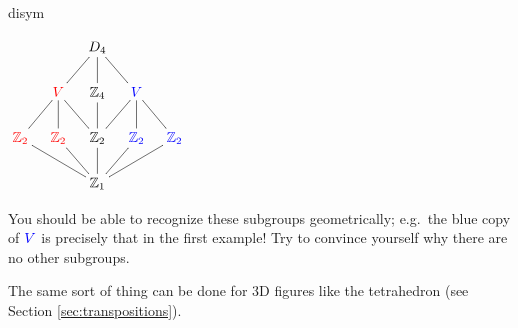 \begin{examples}{}{disym}
\begin{enumerate}
\begin{minipage}[t]{\linewidth}
\begin{minipage}[t]{.31\linewidth}
			$\xymatrix @R18pt @C10pt{%
				&& D_4 \ar@{-}[dl] \ar@{-}[d] \ar@{-}[dr] &&\\
				& \textcolor{red}{V} \ar@{-}[dr] \ar@{-}[d] \ar@{-}[dl] & \Z_4 \ar@{-}[d] & \textcolor{blue}{V} \ar@{-}[dr] \ar@{-}[d] \ar@{-}[dl] & \\
				\textcolor{red}{\Z_2} \ar@{-}[drr] & \textcolor{red}{\Z_2} \ar@{-}[dr] & \Z_2 \ar@{-}[d] & \textcolor{blue}{\Z_2} \ar@{-}[dl] & \textcolor{blue}{\Z_2} \ar@{-}[dll] \\
				&& \Z_1 &&
			}$
		\end{minipage}
	\end{minipage}\par
	
	You should be able to recognize these subgroups geometrically; e.g.\ the blue copy of $\textcolor{blue}{V}$ is precisely that in the first example! Try to convince yourself why there are no other subgroups.
	\end{enumerate}
\end{examples}

The same sort of thing can be done for 3D figures like the tetrahedron (see Section \ref{sec:transpositions}).

\goodbreak

